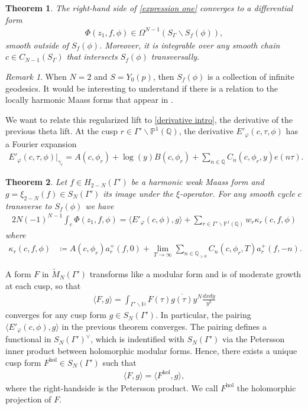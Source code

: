 \documentclass[twoside,a4paper,10pt]{article} %
\newcommand{\Mtil}{\widetilde{M}}
\newcommand{\dxdy}{\frac{dxdy}{y^2}}
\newcommand{\8}{\infty}
\newcommand{\HH}{\mathbb{H}}
\newcommand{\Q}{\mathbb{Q}}
\newcommand{\PP}{\mathbb{P}}
\newcommand{\hol}{\mathrm{hol}}
\theoremstyle{mytheoremstyle}
\newtheorem{thm}{Theorem}[section]
\theoremstyle{remark}
\newtheorem{rmk}{Remark}[section]
\numberwithin{equation}{section}
\begin{document}
\begin{thm} \label{maintheorem1} The right-hand side of \eqref{expression one} converges to a differential form 
\begin{align}
\Phi(z_1,f,\phi) \in \Omega^{N-1}(S_\Gamma \smallsetminus S_f(\phi)),
\end{align}
smooth outside of $S_f(\phi)$. Moreover, it is integrable over any smooth chain $c\in C_{N-1}(S_\Gamma)$ that intersects $S_f(\phi)$ transversally.
\end{thm}
\begin{rmk}
When $N=2$ and $S=Y_0(p)$, then $S_f(\phi)$ is a collection of infinite geodesics. It would be interesting to understand if there is a relation to the locally harmonic Maass forms that appear in \cite{LS22}.
\end{rmk}
 
 \noindent We want to relate this regularized lift to \eqref{derivative intro}, the derivative of the previous theta lift. At the cusp $r \in \Gamma' \backslash \PP^1(\Q)$, the derivative $E'_\varphi(c,\tau,\phi)$ has a Fourier expansion
 \begin{align}
E'_\varphi(c,\tau,\phi)\vert_{\gamma_r}=A(c,\phi_r)+\log(y)B(c,\phi_r)+\sum_{n \in \Q} C_n(c,\phi_r,y)  e(n\tau).
\end{align}



\begin{thm}\label{main formula 1 intro}Let $f \in H_{2-N}(\Gamma')$ be a harmonic weak Maass form and $g=\xi_{2-N}(f) \in S_N(\Gamma')$ its image under the $\xi$-operator. For any smooth cycle $c$ transverse to $S_f(\phi)$ we have 
\begin{align}
2N (-1)^{N-1}\int_{c}\Phi(z_1,f,\phi) =  \langle E'_\varphi(c,\phi),g \rangle+ \sum_{ r \in \Gamma' \backslash \PP^1(\Q)}w_r \kappa_r(c,f,\phi)
\end{align}
where
\begin{align}
\kappa_r(c,f,\phi) & \coloneqq A(c,\phi_r)a^+_r(f,0)  + \lim_{T \rightarrow \8}\sum_{n \in \Q_{>0}}C_n(c,\phi_r,T)  a^+_r(f,-n).
\end{align}
\end{thm}
\noindent A form $F$ in $\Mtil_{N}(\Gamma')$ transforms like a modular form and is of moderate growth at each cusp, so that
\begin{align}
\langle F,g \rangle =\int_{\Gamma' \backslash \HH} F(\tau)\overline{g(\tau)}y^{N}\dxdy
\end{align}
converges for any cusp form $g \in S_N(\Gamma')$. In particular, the pairing $ \langle E'_\varphi(c,\phi),g \rangle$ in the previous theorem converges. The pairing defines a functional in $S_N(\Gamma')^\vee$, which is indentified with $S_N(\Gamma')$ via the Petersson inner product between holomorphic modular forms. Hence, there exists a unique cusp form $F^\hol \in S_N(\Gamma')$ such that
\begin{align}
\langle F,g \rangle=\langle F^\hol,g \rangle,
\end{align}
where the right-handside is the Petersson product. We call $F^\hol$ the holomorphic projection of $F$. 
\end{document}
